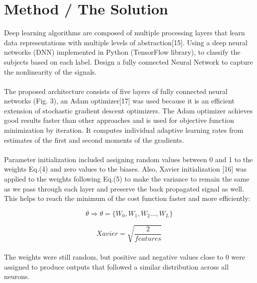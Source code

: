 \documentclass{llncs}       %
\begin{document}
\section{Method / The Solution}
\label{sec:3}
Deep learning algorithms are composed of multiple processing layers that learn data representations with multiple levels of abstraction[15]. Using a deep neural networks (DNN) implemented in Python (TensorFlow library), to classify the subjects based on each label.  Design a fully connected Neural Network to capture the nonlinearity of the signals.
 
\paragraph{}
The proposed architecture consists of five layers of fully connected neural networks (Fig. 3), an Adam optimizer[17] was used because it is an efficient extension of stochastic gradient descent optimizers. The Adam optimizer achieves good results faster than other approaches and is used for objective function minimization by iteration. It computes individual adaptive learning rates from estimates of the first and second moments of the gradients. 

\paragraph{}
Parameter initialization included assigning random values between 0 and 1 to the weights Eq.(4) and zero values to the biases. Also, Xavier initialization [16] was applied to the weights following Eq.(5) to make the variance to remain the same as we pass through each layer and preserve the back propagated signal as well.  This helps to reach the minimum of the cost function faster and more efficiently: 

\begin{equation} 
\theta\Rightarrow\theta=\{W_{0},W_{1},W_{2}...,W_{L}\}
\end{equation}

\begin{equation} 
Xavier = \sqrt{\frac{2}{features}}
\end{equation}

\paragraph{}
The weights were still random, but positive and negative values close to 0 were assigned to produce outputs that followed a similar distribution across all neurons. 
\end{document}
